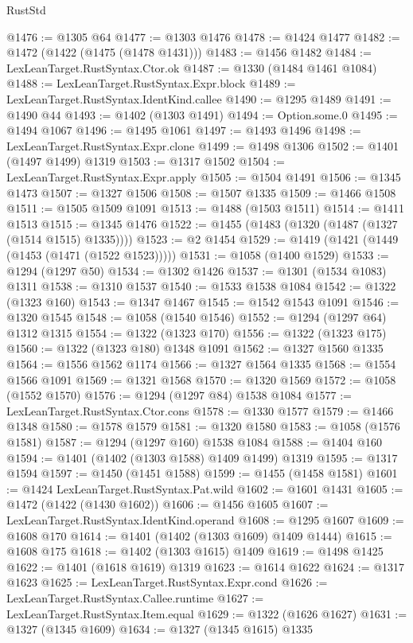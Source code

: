 \begin{lexlean}{RustStd}
\begin{coremodule}
@1476 := @1305 @64
@1477 := @1303 @1476
@1478 := @1424 @1477
@1482 := @1472 (@1422 (@1475 (@1478 @1431)))
@1483 := @1456 @1482
@1484 := LexLeanTarget.RustSyntax.Ctor.ok
@1487 := @1330 (@1484 @1461 @1084)
@1488 := LexLeanTarget.RustSyntax.Expr.block
@1489 := LexLeanTarget.RustSyntax.IdentKind.callee
@1490 := @1295 @1489
@1491 := @1490 @44
@1493 := @1402 (@1303 @1491)
@1494 := Option.some.{0}
@1495 := @1494 @1067
@1496 := @1495 @1061
@1497 := @1493 @1496
@1498 := LexLeanTarget.RustSyntax.Expr.clone
@1499 := @1498 @1306
@1502 := @1401 (@1497 @1499) @1319
@1503 := @1317 @1502
@1504 := LexLeanTarget.RustSyntax.Expr.apply
@1505 := @1504 @1491
@1506 := @1345 @1473
@1507 := @1327 @1506
@1508 := @1507 @1335
@1509 := @1466 @1508
@1511 := @1505 @1509 @1091
@1513 := @1488 (@1503 @1511)
@1514 := @1411 @1513
@1515 := @1345 @1476
@1522 := @1455 (@1483 (@1320 (@1487 (@1327 (@1514 @1515) @1335))))
@1523 := @2 @1454
@1529 := @1419 (@1421 (@1449 (@1453 (@1471 (@1522 @1523)))))
@1531 := @1058 (@1400 @1529)
@1533 := @1294 (@1297 @50)
@1534 := @1302 @1426
@1537 := @1301 (@1534 @1083) @1311
@1538 := @1310 @1537
@1540 := @1533 @1538 @1084
@1542 := @1322 (@1323 @160)
@1543 := @1347 @1467
@1545 := @1542 @1543 @1091
@1546 := @1320 @1545
@1548 := @1058 (@1540 @1546)
@1552 := @1294 (@1297 @64) @1312 @1315
@1554 := @1322 (@1323 @170)
@1556 := @1322 (@1323 @175)
@1560 := @1322 (@1323 @180) @1348 @1091
@1562 := @1327 @1560 @1335
@1564 := @1556 @1562 @1174
@1566 := @1327 @1564 @1335
@1568 := @1554 @1566 @1091
@1569 := @1321 @1568
@1570 := @1320 @1569
@1572 := @1058 (@1552 @1570)
@1576 := @1294 (@1297 @84) @1538 @1084
@1577 := LexLeanTarget.RustSyntax.Ctor.cons
@1578 := @1330 @1577
@1579 := @1466 @1348
@1580 := @1578 @1579
@1581 := @1320 @1580
@1583 := @1058 (@1576 @1581)
@1587 := @1294 (@1297 @160) @1538 @1084
@1588 := @1404 @160
@1594 := @1401 (@1402 (@1303 @1588) @1409 @1499) @1319
@1595 := @1317 @1594
@1597 := @1450 (@1451 @1588)
@1599 := @1455 (@1458 @1581)
@1601 := @1424 LexLeanTarget.RustSyntax.Pat.wild
@1602 := @1601 @1431
@1605 := @1472 (@1422 (@1430 @1602))
@1606 := @1456 @1605
@1607 := LexLeanTarget.RustSyntax.IdentKind.operand
@1608 := @1295 @1607
@1609 := @1608 @170
@1614 := @1401 (@1402 (@1303 @1609) @1409 @1444)
@1615 := @1608 @175
@1618 := @1402 (@1303 @1615) @1409
@1619 := @1498 @1425
@1622 := @1401 (@1618 @1619) @1319
@1623 := @1614 @1622
@1624 := @1317 @1623
@1625 := LexLeanTarget.RustSyntax.Expr.cond
@1626 := LexLeanTarget.RustSyntax.Callee.runtime
@1627 := LexLeanTarget.RustSyntax.Item.equal
@1629 := @1322 (@1626 @1627)
@1631 := @1327 (@1345 @1609)
@1634 := @1327 (@1345 @1615) @1335

\end{coremodule}
\end{lexlean}
